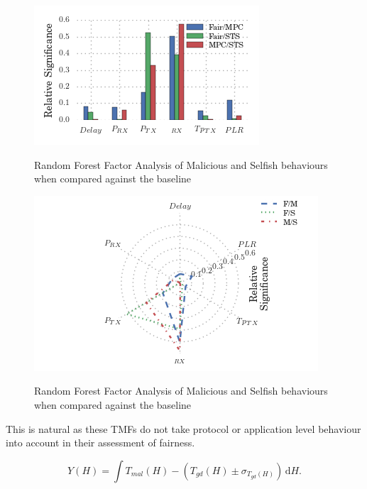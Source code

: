 \documentclass[conference]{IEEEtran}
\begin{document}
\begin{figure}
  \centering
  \includegraphics[width=0.95\linewidth]{img/MaliciousSelfishMetricFactors}\label{fig:malselfactors}
  \caption{Random Forest Factor Analysis of Malicious and Selfish behaviours when compared against the baseline}
\end{figure}
\begin{figure}
  \centering
  \includegraphics[width=0.95\linewidth]{img/MaliciousSelfishMetricFactorsRad}\label{fig:malselfactorsrad}
  \caption{Random Forest Factor Analysis of Malicious and Selfish behaviours when compared against the baseline}
\end{figure}

This is natural as these TMFs do not take protocol or application level behaviour into account in their assessment of fairness.

\begin{equation}
  Y(H) = \int \! T_{mal}(H) - (T_{gd}(H)\pm\sigma_{T_{gd}(H)})\, \mathrm{d}H.
  \label{eq:regression_target}
\end{equation}
\end{document}
